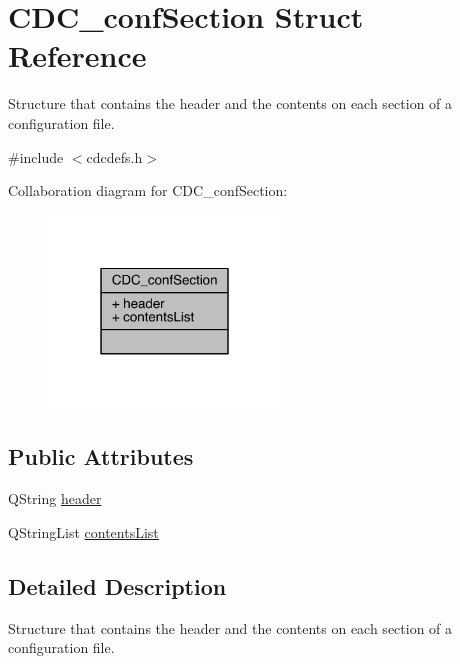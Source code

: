 \hypertarget{struct_c_d_c__conf_section}{\section{C\+D\+C\+\_\+conf\+Section Struct Reference}
\label{struct_c_d_c__conf_section}
}


Structure that contains the header and the contents on each section of a configuration file.  




{\ttfamily \#include $<$cdcdefs.\+h$>$}



Collaboration diagram for C\+D\+C\+\_\+conf\+Section\+:\nopagebreak
\begin{figure}[H]
\begin{center}
\leavevmode
\includegraphics[width=175pt]{struct_c_d_c__conf_section__coll__graph}
\end{center}
\end{figure}
\subsection*{Public Attributes}
\begin{DoxyCompactItemize}
\item 
Q\+String \hyperlink{struct_c_d_c__conf_section_a4cd2f8b187662844e29d66c4ddab046e}{header}
\item 
Q\+String\+List \hyperlink{struct_c_d_c__conf_section_a67a9f966e4b9bb43d54f1640421b6f72}{contents\+List}
\end{DoxyCompactItemize}


\subsection{Detailed Description}
Structure that contains the header and the contents on each section of a configuration file. 



